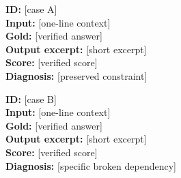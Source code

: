 \begin{minipage}[t]{.485\textwidth}
\begin{tcolorbox}[enhanced,title={Case A: [success behavior]},fontupper=\small,colback=LighterGray,colframe=DeepPurple,colbacktitle=DeepPurple,coltitle=White,left=3mm,right=3mm]
\textbf{ID:} [case A]\\
\textbf{Input:} [one-line context]\\
\textbf{Gold:} [verified answer]\\
\textbf{Output excerpt:} [short excerpt]\\
\textbf{Score:} [verified score]\\
\textbf{Diagnosis:} [preserved constraint]
\end{tcolorbox}
\end{minipage}\hfill
\begin{minipage}[t]{.485\textwidth}
\begin{tcolorbox}[enhanced,title={Case B: [failure mode]},fontupper=\small,colback=LighterGray,colframe=DeepPurple,colbacktitle=DeepPurple,coltitle=White,left=3mm,right=3mm]
\textbf{ID:} [case B]\\
\textbf{Input:} [one-line context]\\
\textbf{Gold:} [verified answer]\\
\textbf{Output excerpt:} [short excerpt]\\
\textbf{Score:} [verified score]\\
\textbf{Diagnosis:} [specific broken dependency]
\end{tcolorbox}
\end{minipage}
